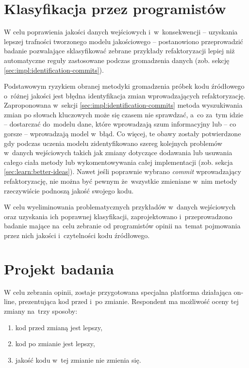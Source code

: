\documentclass[twoside]{praca}
\begin{document}
\section{Klasyfikacja przez programistów}
\label{sec:impl:codefracz}

W celu poprawienia jakości danych wejściowych i~w~konsekwencji -- uzyskania lepszej trafności tworzonego modelu jakościowego -- postanowiono przeprowadzić badanie pozwalające sklasyfikować zebrane przykłady refaktoryzacji lepiej niż automatyczne reguły zastosowane podczas gromadzenia danych (zob. sekcję \ref{sec:impl:identification-commits}).

Podstawowym ryzykiem obranej metodyki gromadzenia próbek kodu źródłowego o~różnej jakości jest błędna identyfikacja zmian wprowadzających refaktoryzację. Zaproponowana w~sekcji \ref{sec:impl:identification-commits} metoda wyszukiwania zmian po słowach kluczowych może się czasem nie sprawdzać, a~co za~tym idzie -- dostarczać do~modelu dane, które wprowadzają szum informacyjny lub -- co gorsze -- wprowadzają model w~błąd. Co więcej, te obawy zostały potwierdzone gdy podczas uczenia modelu zidentyfikowano szereg kolejnych problemów w~danych wejściowych takich jak zmiany dotyczące dodawania lub usuwania całego ciała metody lub wykomentowywania całej implementacji (zob. sekcja \ref{sec:learn:better-ideas}). Nawet jeśli poprawnie wybrano \textit{commit} wprowadzający refaktoryzację, nie można być pewnym że~wszystkie zmieniane w~nim metody rzeczywiście podnoszą jakość swojego kodu.

W celu wyeliminowania problematycznych przykładów w~danych wejściowych oraz uzyskania ich poprawnej klasyfikacji, zaprojektowano i~przeprowadzono badanie mające na~celu zebranie od programistów opinii na~temat pojmowania przez nich jakości i~czytelności kodu źródłowego.

\section{Projekt badania}
\label{sec:impl:codefracz-project}
W celu zebrania opinii, zostaje przygotowana specjalna platforma działająca on-line, prezentująca kod przed i~po zmianie. Respondent ma możliwość oceny tej zmiany na~trzy sposoby:

\begin{enumerate}
\item kod przed zmianą jest lepszy,
\item kod po zmianie jest lepszy,
\item jakość kodu w~tej zmianie nie zmienia się.
\end{enumerate}
\end{document}
